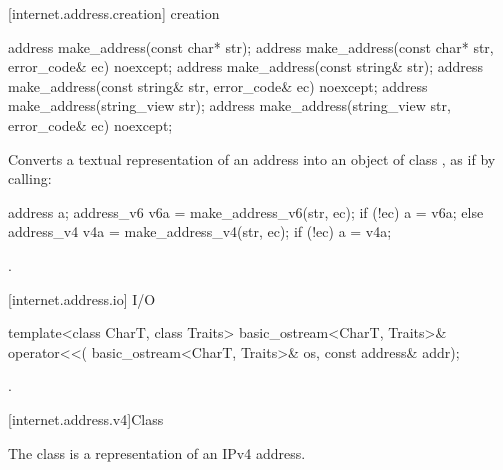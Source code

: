 [internet.address.creation]{ creation}

%
\begin{itemdecl}
address make_address(const char* str);
address make_address(const char* str, error_code& ec) noexcept;
address make_address(const string& str);
address make_address(const string& str, error_code& ec) noexcept;
address make_address(string_view str);
address make_address(string_view str, error_code& ec) noexcept;
\end{itemdecl}

\begin{itemdescr}
\pnum
\effects Converts a textual representation of an address into an object of class , as if by calling: 
\begin{codeblock}
address a;
address_v6 v6a = make_address_v6(str, ec);
if (!ec)
  a = v6a;
else
{
  address_v4 v4a = make_address_v4(str, ec);
  if (!ec)
    a = v4a;
}
\end{codeblock}


\pnum
\returns {}.
\end{itemdescr}



[internet.address.io]{ I/O}

%
\begin{itemdecl}
template<class CharT, class Traits>
  basic_ostream<CharT, Traits>& operator<<(
    basic_ostream<CharT, Traits>& os, const address& addr);
\end{itemdecl}

\begin{itemdescr}
\pnum
\returns {}.
\end{itemdescr}




[internet.address.v4]{Class }

\pnum
The class  is a representation of an IPv4 address.

